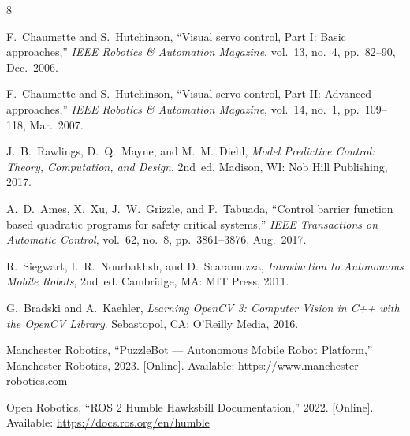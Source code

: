 \documentclass[journal, 10pt]{IEEEtran}
\begin{document}

\begin{thebibliography}{8}

F.~Chaumette and S.~Hutchinson,
``Visual servo control, Part I: Basic approaches,''
\emph{IEEE Robotics \& Automation Magazine},
vol.~13, no.~4, pp.~82--90, Dec.~2006.

F.~Chaumette and S.~Hutchinson,
``Visual servo control, Part II: Advanced approaches,''
\emph{IEEE Robotics \& Automation Magazine},
vol.~14, no.~1, pp.~109--118, Mar.~2007.

J.~B.~Rawlings, D.~Q.~Mayne, and M.~M.~Diehl,
\emph{Model Predictive Control: Theory, Computation, and Design},
2nd~ed. Madison, WI: Nob Hill Publishing, 2017.

A.~D.~Ames, X.~Xu, J.~W.~Grizzle, and P.~Tabuada,
``Control barrier function based quadratic programs for safety critical
systems,''
\emph{IEEE Transactions on Automatic Control},
vol.~62, no.~8, pp.~3861--3876, Aug.~2017.

R.~Siegwart, I.~R.~Nourbakhsh, and D.~Scaramuzza,
\emph{Introduction to Autonomous Mobile Robots},
2nd~ed. Cambridge, MA: MIT Press, 2011.

G.~Bradski and A.~Kaehler,
\emph{Learning OpenCV 3: Computer Vision in C++ with the OpenCV Library}.
Sebastopol, CA: O'Reilly Media, 2016.

Manchester Robotics,
``PuzzleBot --- Autonomous Mobile Robot Platform,''
Manchester Robotics, 2023.
[Online]. Available: \url{https://www.manchester-robotics.com}

Open Robotics,
``ROS 2 Humble Hawksbill Documentation,''
2022.
[Online]. Available: \url{https://docs.ros.org/en/humble}

\end{thebibliography}
\end{document}
